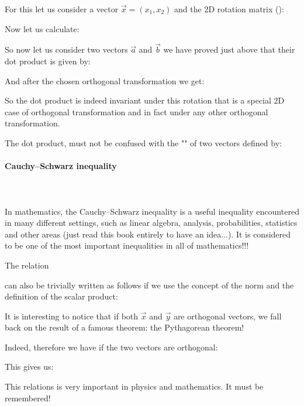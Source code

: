 	For this let us consider a vector $\vec{x}=(x_1,x_2)$ and the 2D rotation matrix ():
	
	Now let us calculate:
	
	So now let us consider two vectors $\vec{a}$ and $\vec{b}$ we have proved just above that their dot product is given by:
	
	And after the chosen orthogonal transformation we get:
	
	So the dot product is indeed invariant under this rotation that is a special 2D case of orthogonal transformation  and in fact under any other orthogonal transformation.
	
	\begin{tcolorbox}[title=Remark,colframe=black,arc=10pt]
	The dot product, must not  be confused with the "\label{element-wise multiplication}" of two vectors defined by:
	
	\end{tcolorbox}		
	
	\pagebreak
	\paragraph{Cauchy–Schwarz inequality}\mbox{}\\\\
	In mathematics, the Cauchy–Schwarz inequality is a useful inequality encountered in many different settings, such as linear algebra, analysis, probabilities, statistics and other areas (just read this book entirely to have an idea...). It is considered to be one of the most important inequalities in all of mathematics!!!
	
	The relation
	
	 can also be trivially written as follows if we use the concept of the norm and the definition of the scalar product:
	 
	 It is interesting to notice that if both $\vec{x}$ and $\vec{y}$ are orthogonal vectors, we fall back on the result of a famous theorem: the Pythagorean theorem!

	Indeed, therefore we have if the two vectors are orthogonal:
	 
		This gives us:
	 
	This relations is very important in physics and mathematics. It must be remembered!
	 
